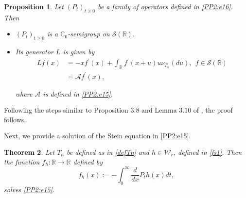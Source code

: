 \documentclass[12pt, a4paper,reqno]{amsart}
\newtheorem{thm}{Theorem}[section]
\newtheorem{pro}[thm]{Proposition}
\theoremstyle{definition}
\theoremstyle{myremark}
\numberwithin{equation}{section}
\begin{document}
\begin{pro}\label{PP2:proSem}
	Let $(P_{t})_{t\geq0}$ be a family of operators defined in \eqref{PP2:e16}. Then
	\begin{itemize}
		\item [(i)] $(P_{t})_{t\geq 0}$ is a $\mathbb{C}_0$-semigroup on $\mathcal{S}(\mathbb{{R}})$.
		\item [(ii)] Its generator $L$ is given by
		\begin{align}
		\nonumber Lf(x)&=-xf^{\prime}(x)+\displaystyle\int_{\mathbb R}f^{\prime}(x+u)u\nu_{T_n}(du),~~f\in\mathcal{S}(\mathbb{R})\\
		\label{e7}&=\mathcal{A}f^{\prime}(x),
		\end{align}	
		
		\noindent
		where $\mathcal{A}$ is defined in \eqref{PP2:e15}.
	\end{itemize}
\end{pro}
\noindent
Following the steps similar to Proposition 3.8 and Lemma 3.10 of \cite{k1}, the proof follows.

\noindent
Next, we provide a solution of the Stein equation in \eqref{PP2:e15}.

\vfill
\begin{thm}\label{thmsol}
	Let $T_n$ be defined as in \eqref{defTn} and $h\in\mathcal{W}_{r}$, defined in \eqref{fs1}. Then the function $f_{h}:\mathbb{R}\to \mathbb{R}$ defined by 
	\begin{equation}\label{PP2:SolSe}
	f_{h}(x):=-\displaystyle
	\int_{0}^{\infty}\frac{d}{dx}P_{t}h(x)dt,
	\end{equation}
	solves \eqref{PP2:e15}.	
\end{thm}
\end{document}
